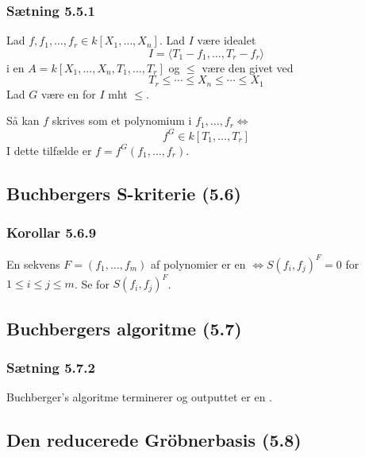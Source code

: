 \subsubsection{Sætning 5.5.1}
\label{Saetning 5.5.1}
Lad $f,f_1,\ldots,f_r \in k[X_1,\ldots,X_n]$. Lad $I$ være idealet
\begin{equation*}
  I = \langle T_1 - f_1,\ldots, T_r - f_r \rangle
\end{equation*}
i en $A = k[X_1,\ldots,X_n,T_1,\ldots,T_r]$ og $\leq$
være den  givet ved
\begin{equation*}
  T_r \leq \cdots \leq X_n \leq \cdots \leq X_1
\end{equation*}
Lad $G$ være en  for $I$ mht $\leq$.

Så kan $f$ skrives som et polynomium i $f_1,\ldots,f_r \iff$
\begin{equation*}
  f^G \in k[T_1,\ldots,T_r]
\end{equation*}
I dette tilfælde er $f = f^G(f_1,\ldots,f_r)$.

\subsection{Buchbergers S-kriterie (5.6)}
\label{Buchbergers S-kriterie (5.6)}
\subsubsection{Korollar 5.6.9}
\label{Korollar 5.6.9}
En sekvens $F = (f_1, \ldots, f_m)$ af polynomier er en 
$\iff S(f_i, f_j)^F = 0$ for $1 \leq i \leq j \leq m$. Se 
for $S(f_i, f_j)^F$.

\subsection{Buchbergers algoritme (5.7)}
\label{Buchbergers algoritme (5.7)}
\subsubsection{Sætning 5.7.2}
\label{Saetning 5.7.2}
Buchberger's algoritme terminerer og outputtet er en .

\subsection{Den reducerede Gröbnerbasis (5.8)}
\label{Den reducerede Gröbnerbasis (5.8)}
